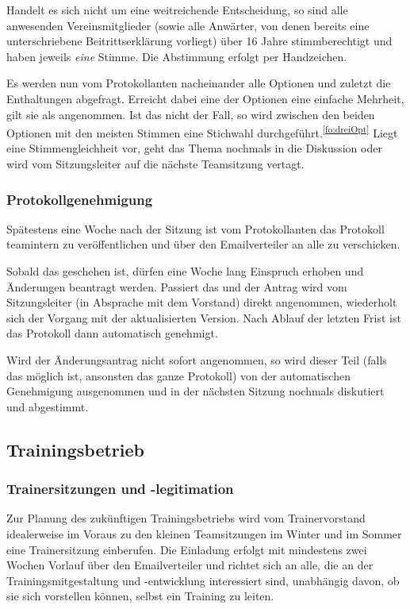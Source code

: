 \documentclass[a4 paper, 11pt]{article}
\begin{document}
Handelt es sich nicht um eine weitreichende Entscheidung, so sind alle anwesenden Vereinsmitglieder (sowie alle Anwärter, von denen bereits eine unterschriebene Beitrittserklärung vorliegt) über 16 Jahre 
stimmberechtigt und haben jeweils \emph{eine} Stimme. Die Abstimmung erfolgt per Handzeichen.

Es werden nun vom Protokollanten nacheinander alle Optionen und zuletzt die Enthaltungen abgefragt. Erreicht dabei eine der Optionen eine einfache Mehrheit,
gilt sie als angenommen. Ist das nicht der Fall, so wird zwischen den beiden Optionen mit den meisten Stimmen eine Stichwahl durchgeführt.\textsuperscript{\ref{fo:dreiOpt}} Liegt eine Stimmengleichheit vor, geht das Thema nochmals in die Diskussion oder wird vom Sitzungsleiter auf die nächste Teamsitzung vertagt.

\subsubsection{Protokollgenehmigung} \label{protokolle}
Spätestens eine Woche nach der Sitzung ist vom Protokollanten das Protokoll teamintern zu veröffentlichen und über den Emailverteiler an alle zu verschicken.

Sobald das geschehen ist, dürfen eine Woche lang Einspruch erhoben und Änderungen beantragt werden. Passiert das und der Antrag wird vom Sitzungsleiter (in Absprache mit dem Vorstand) direkt angenommen, wiederholt sich der Vorgang mit der aktualisierten Version. Nach Ablauf der letzten Frist ist das Protokoll dann automatisch genehmigt.
	
Wird der Änderungsantrag nicht sofort angenommen, so wird dieser Teil (falls das möglich ist, ansonsten das ganze Protokoll) von der automatischen Genehmigung ausgenommen und in der nächsten Sitzung nochmals diskutiert und abgestimmt.

\subsection{Trainingsbetrieb}
\subsubsection{Trainersitzungen und -legitimation} \label{trainermeetings}
Zur Planung des zukünftigen Trainingsbetriebs wird vom Trainervorstand idealerweise im Voraus zu den kleinen Teamsitzungen im Winter und im Sommer eine Trainersitzung einberufen. Die Einladung erfolgt mit mindestens zwei Wochen Vorlauf über den Emailverteiler und richtet sich an alle, die an der Trainingsmitgestaltung und -entwicklung interessiert sind, unabhängig davon, ob sie sich vorstellen können, selbst ein Training zu leiten.
\end{document}
